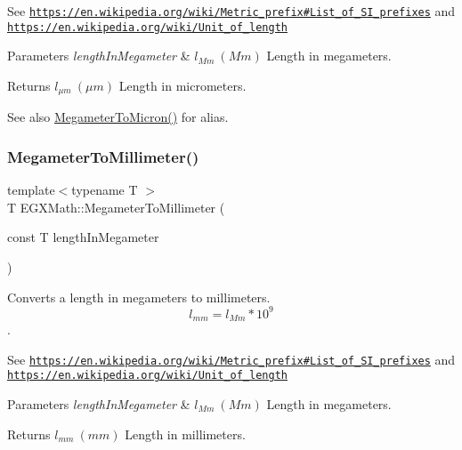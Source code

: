 See \href{https://en.wikipedia.org/wiki/Metric_prefix#List_of_SI_prefixes}{\tt https\+://en.\+wikipedia.\+org/wiki/\+Metric\+\_\+prefix\#\+List\+\_\+of\+\_\+\+S\+I\+\_\+prefixes} and \href{https://en.wikipedia.org/wiki/Unit_of_length}{\tt https\+://en.\+wikipedia.\+org/wiki/\+Unit\+\_\+of\+\_\+length} 
\begin{DoxyParams}{Parameters}
{\em length\+In\+Megameter} & $ l_{Mm}\ (Mm)$ Length in megameters. \\
\hline
\end{DoxyParams}
\begin{DoxyReturn}{Returns}
$ l_{\mu m}\ (\mu m)$ Length in micrometers. 
\end{DoxyReturn}
\begin{DoxySeeAlso}{See also}
\mbox{\hyperlink{group___e_g_x_math-_conversions-_length_conversions-_megameter-_non-_s_i_ga14e6b356b28257b1bde9cb9ebf6bc3c6}{Megameter\+To\+Micron()}} for alias. 
\end{DoxySeeAlso}
\mbox{\label{group___e_g_x_math-_conversions-_length_conversions-_megameter-_s_i_ga8fd5a24935e05ff3f6e0f7e35379357f}} 
\subsubsection{\texorpdfstring{Megameter\+To\+Millimeter()}{MegameterToMillimeter()}}
{\footnotesize\ttfamily template$<$typename T $>$ \\
T E\+G\+X\+Math\+::\+Megameter\+To\+Millimeter (\begin{DoxyParamCaption}\item[{const T}]{length\+In\+Megameter }\end{DoxyParamCaption})}



Converts a length in megameters to millimeters. \[ l_{mm}=l_{Mm} * 10^{9} \]. 

See \href{https://en.wikipedia.org/wiki/Metric_prefix#List_of_SI_prefixes}{\tt https\+://en.\+wikipedia.\+org/wiki/\+Metric\+\_\+prefix\#\+List\+\_\+of\+\_\+\+S\+I\+\_\+prefixes} and \href{https://en.wikipedia.org/wiki/Unit_of_length}{\tt https\+://en.\+wikipedia.\+org/wiki/\+Unit\+\_\+of\+\_\+length} 
\begin{DoxyParams}{Parameters}
{\em length\+In\+Megameter} & $ l_{Mm}\ (Mm)$ Length in megameters. \\
\hline
\end{DoxyParams}
\begin{DoxyReturn}{Returns}
$ l_{mm}\ (mm)$ Length in millimeters. 
\end{DoxyReturn}
\mbox{\label{group___e_g_x_math-_conversions-_length_conversions-_megameter-_s_i_ga4b35e7fac8eeb2e9e6db36a4c63e3073}} 
